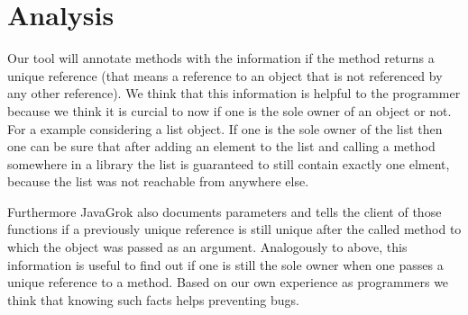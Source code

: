 \section{Analysis}

Our tool will annotate methods with the information if the method returns a 
unique reference (that means a reference to an object that is not referenced 
by any other reference). We think that this information is helpful to the 
programmer because we think it is curcial to now if one is the sole owner of 
an object or not. For a example considering a list object. If one is the sole
owner of the list then one can be sure that after adding an element to the list
and calling a method somewhere in a library the list is guaranteed to still 
contain exactly one elment, because the list was not reachable from anywhere
else.

Furthermore JavaGrok also documents parameters and tells the client
of those functions if a previously unique reference is still unique after the 
called method to which the object was passed as an argument. Analogously to 
above, this information is useful to find out if one is still the sole owner
when one passes a unique reference to a method. Based on our own experience
as programmers we think that knowing such facts helps preventing bugs.